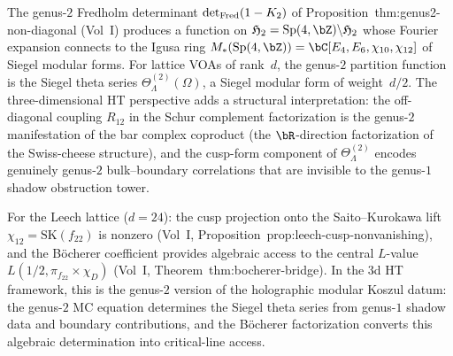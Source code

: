 \begin{remark}%
\label{rem:thqg-siegel-genus2}%
%
%
The genus-$2$ Fredholm determinant
$\mathrm{det}_{\mathrm{Fred}}(1 - K_2)$ of
Proposition~\textup{thm:genus2-non-diagonal}
\textup{(}Vol~I\textup{)} produces a function on
$\Siegel_2 = \Sp(4,\bZ) \backslash \mathfrak{H}_2$
whose Fourier expansion connects to the Igusa ring
$M_*(\Sp(4,\bZ)) = \bC[E_4, E_6, \chi_{10}, \chi_{12}]$
of Siegel modular forms.
For lattice VOAs of rank~$d$, the genus-$2$ partition
function is the Siegel theta series
$\Theta_\Lambda^{(2)}(\Omega)$, a Siegel modular form of
weight~$d/2$. The three-dimensional HT perspective adds
a structural interpretation: the off-diagonal coupling
$R_{12}$ in the Schur complement factorization is the
genus-$2$ manifestation of the bar complex coproduct
\textup{(}the $\bR$-direction factorization of the
Swiss-cheese structure\textup{)}, and the cusp-form
component of $\Theta_\Lambda^{(2)}$ encodes
genuinely genus-$2$ bulk--boundary correlations that
are invisible to the genus-$1$ shadow obstruction tower.

For the Leech lattice \textup{(}$d = 24$\textup{)}:
the cusp projection onto the Saito--Kurokawa lift
$\chi_{12} = \mathrm{SK}(f_{22})$ is nonzero
\textup{(}Vol~I, Proposition~\textup{prop:leech-cusp-nonvanishing}\textup{)},
and the B\"ocherer coefficient provides algebraic access
to the central $L$-value $L(1/2, \pi_{f_{22}} \times \chi_D)$
\textup{(}Vol~I, Theorem~\textup{thm:bocherer-bridge}\textup{)}.
In the 3d HT framework, this is the genus-$2$ version of
the holographic modular Koszul datum:
the genus-$2$ MC equation determines the Siegel theta
series from genus-$1$ shadow data and boundary
contributions, and the B\"ocherer factorization converts
this algebraic determination into critical-line access.
\end{remark}

